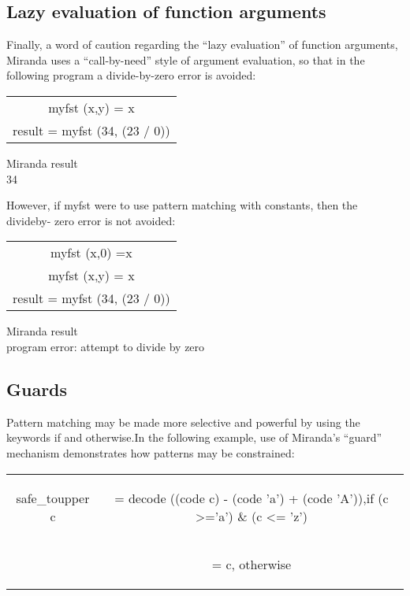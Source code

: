 \documentclass[11pt]{article}
\begin{document}
\subsection{Lazy evaluation of function arguments}

Finally, a word of caution regarding the “lazy evaluation” of function arguments, Miranda uses a “call-by-need” style of argument evaluation,
so that in the following program a divide-by-zero error is avoided:


\begin{center}
    \begin{tabular}{|c|}
         \hline
          myfst (x,y) = x\\
result = myfst (34, (23 / 0))\\
          \hline
    \end{tabular}
\end{center}

\begin{tcolorbox}
Miranda result\\
34
\end{tcolorbox}

However, if myfst were to use pattern matching with constants, then the divideby-
zero error is not avoided:

\begin{center}
    \begin{tabular}{|c|}
         \hline
         myfst (x,0) =x\\
          myfst (x,y) = x\\
result = myfst (34, (23 / 0))\\
          \hline
    \end{tabular}
\end{center}


\begin{tcolorbox}
Miranda result\\
program error: attempt to divide by zero
\end{tcolorbox}

\subsection{Guards}

Pattern matching may be made more selective and
powerful by using the keywords if and otherwise.In the following example, use of
Miranda’s “guard” mechanism demonstrates how patterns may be constrained:


\begin{center}
    
    \begin{tabular}{|c c|}
    \hline
         safe\_toupper c
 & \begin{flushleft} = decode ((code c) - (code ’a’) + (code ’A’)),if (c >=’a’) \& (c <= ’z’)\end{flushleft} \\
 & \begin{flushleft} = c, otherwise \end{flushleft} \\
\hline
    \end{tabular}
    
\end{center}
\end{document}
